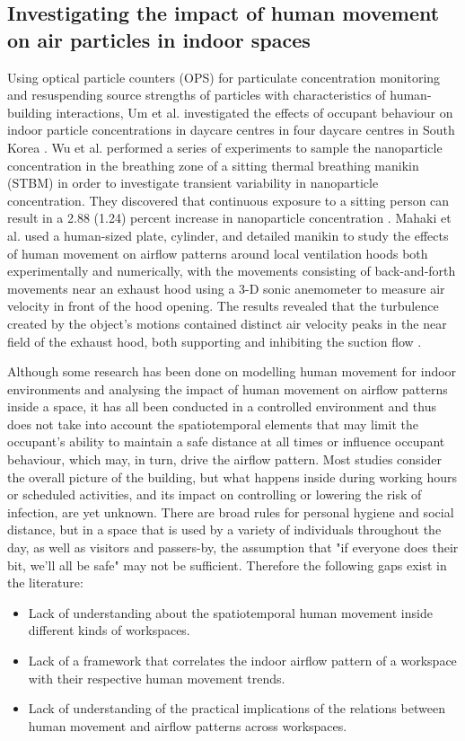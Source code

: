 \documentclass[acmtog]{acmart}
\begin{document}
\subsection{Investigating the impact of human movement on air particles in indoor spaces}
Using optical particle counters (OPS) for particulate concentration monitoring and resuspending source strengths of particles with characteristics of human-building interactions, Um et al. investigated the effects of occupant behaviour on indoor particle concentrations in daycare centres in four daycare centres in South Korea \cite{um2022occupant}.  Wu et al. performed a series of experiments to sample the nanoparticle concentration in the breathing zone of a sitting thermal breathing manikin (STBM) in order to investigate transient variability in nanoparticle concentration. They discovered that continuous exposure to a sitting person can result in a 2.88 (1.24) percent increase in nanoparticle concentration \cite{wu2022transient}. Mahaki et al. used a human-sized plate, cylinder, and detailed manikin to study the effects of human movement on airflow patterns around local ventilation hoods both experimentally and numerically, with the movements consisting of back-and-forth movements near an exhaust hood using a 3-D sonic anemometer to measure air velocity in front of the hood opening. The results revealed that the turbulence created by the object's motions contained distinct air velocity peaks in the near field of the exhaust hood, both supporting and inhibiting the suction flow \cite{mahaki2021comparing}.



Although some research has been done on modelling human movement for indoor environments and analysing the impact of human movement on airflow patterns inside a space, it has all been conducted in a controlled environment and thus does not take into account the spatiotemporal elements that may limit the occupant's ability to maintain a safe distance at all times or influence occupant behaviour, which may, in turn, drive the airflow pattern. Most studies consider the overall picture of the building, but what happens inside during working hours or scheduled activities, and its impact on controlling or lowering the risk of infection, are yet unknown. There are broad rules for personal hygiene and social distance, but in a space that is used by a variety of individuals throughout the day, as well as visitors and passers-by, the assumption that "if everyone does their bit, we'll all be safe" may not be sufficient.
Therefore the following gaps exist in the literature:
\begin{itemize}
    \item Lack of understanding about the spatiotemporal human movement inside different kinds of workspaces.
    \item Lack of a framework that correlates the indoor airflow pattern of a workspace with their respective human movement trends.
    \item Lack of understanding of the practical implications of the relations between human movement and airflow patterns across workspaces.
\end{itemize}
\end{document}
